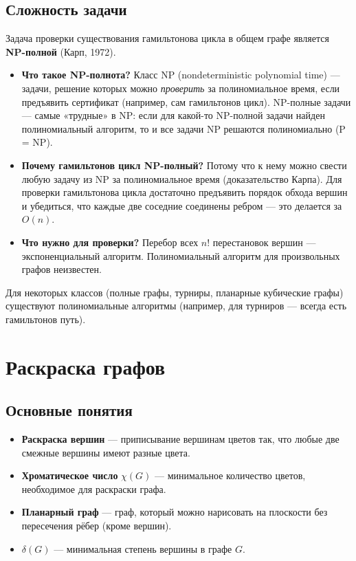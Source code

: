 \documentclass[12pt]{article}
\begin{document}
\begin{enumerate}
\subsection{Сложность задачи}
Задача проверки существования гамильтонова цикла в общем графе является \textbf{NP-полной} (Карп, 1972). 
\begin{itemize}
    \item \textbf{Что такое NP-полнота?} Класс NP (nondeterministic polynomial time) — задачи, решение которых можно \textit{проверить} за полиномиальное время, если предъявить сертификат (например, сам гамильтонов цикл). NP-полные задачи — самые «трудные» в NP: если для какой-то NP-полной задачи найден полиномиальный алгоритм, то и все задачи NP решаются полиномиально (P = NP). 
    \item \textbf{Почему гамильтонов цикл NP-полный?} Потому что к нему можно свести любую задачу из NP за полиномиальное время (доказательство Карпа). Для проверки гамильтонова цикла достаточно предъявить порядок обхода вершин и убедиться, что каждые две соседние соединены ребром — это делается за \(O(n)\).
    \item \textbf{Что нужно для проверки?} Перебор всех \(n!\) перестановок вершин — экспоненциальный алгоритм. Полиномиальный алгоритм для произвольных графов неизвестен.
\end{itemize}
Для некоторых классов (полные графы, турниры, планарные кубические графы) существуют полиномиальные алгоритмы (например, для турниров — всегда есть гамильтонов путь).

\section{Раскраска графов}
\subsection{Основные понятия}
\begin{itemize}
    \item \textbf{Раскраска вершин} — приписывание вершинам цветов так, что любые две смежные вершины имеют разные цвета.
    \item \textbf{Хроматическое число} \(\chi(G)\) — минимальное количество цветов, необходимое для раскраски графа.
    \item \textbf{Планарный граф} — граф, который можно нарисовать на плоскости без пересечения рёбер (кроме вершин).
    \item \(\delta(G)\) — минимальная степень вершины в графе \(G\).
\end{itemize}


\end{enumerate}
\end{document}
